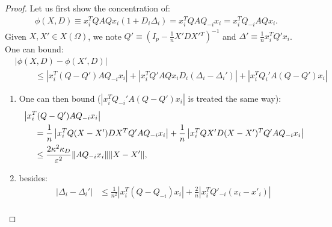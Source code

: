 \documentclass[a4papaer, titlepage]{book}
\begin{document}
 \begin{proof}
  Let us first show the concentration of:
  \begin{align*}
    \phi(X,D) 
    \equiv x_i^TQAQx_i (1+D_i \Delta_i)
    = x_i^TQAQ_{-i}x_i = x_i^TQ_{-i}AQx_i.
  \end{align*}
  Given $X,X' \in X(\Omega)$, we note $Q' \equiv (I_p - \frac{1}{n}X'DX'{}^T)^{-1}$ and $\Delta' \equiv \frac{1}{n}x_i^TQ'x_i$. One can bound:
   \begin{align*}
    &\left\vert \phi(X,D) - \phi(X',D) \right\vert \\
    &\hspace{1cm} \leq \left\vert x_i^T(Q-Q')AQ_{-i}x_i \right\vert + \left\vert x_i^TQ'AQx_i D_i (\Delta_i - \Delta_i')\right\vert + \left\vert x_i^TQ_{i}'A(Q-Q')x_i \right\vert
   \end{align*}
   \begin{enumerate}
     \item 
   One can then bound ($\left\vert x_i^TQ_{-i}'A(Q-Q')x_i \right\vert$ is treated the same way):
   \begin{align*}
     &\left\vert x_i^T(Q-Q')AQ_{-i}x_i \right\vert\\
     &\hspace{0.5cm}= \frac{1}{n} \left\vert x_i^TQ(X-X')DX^TQ'AQ_{-i}x_i \right\vert + \frac{1}{n} \left\vert x_i^TQX'D(X-X')^TQ'AQ_{-i}x_i \right\vert \\
     &\hspace{0.5cm}\leq \frac{2\kappa^2\kappa_D}{\varepsilon^2}\|AQ_{-i}x_i\| \|X-X'\|,
   \end{align*}
   \item besides:
   \begin{align*}
     \left\vert \Delta_i - \Delta_i' \right\vert 
     &\leq  \frac{1}{n^2}\left\vert x_i^T(Q-Q_{-i}) x_i \right\vert 
     + \frac{2}{n} \left\vert x_i^TQ'_{-i} (x_i- x'_i) \right\vert\\

\end{align*}
\end{enumerate}
\end{proof}
\end{document}
